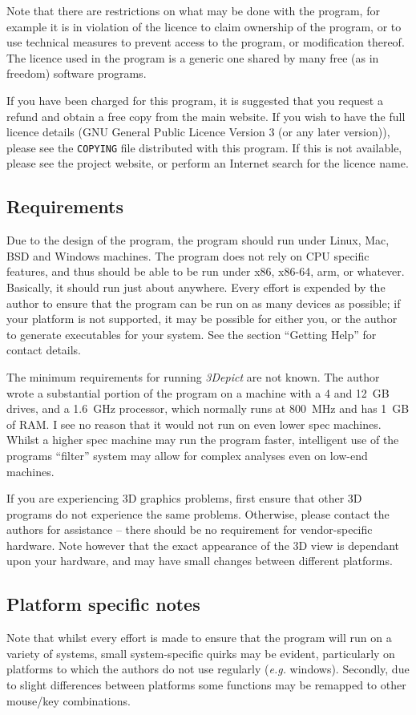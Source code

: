 \documentclass[10pt]{article}
\begin{document}
Note that there are restrictions on what may be done with the program, for example it is in violation of the licence to claim ownership of the program, or to use technical measures to prevent access to the program, or modification thereof. The licence used in the program is a generic one shared by many free (as in freedom) software programs. 

If you have been charged for this program, it is suggested that you request a refund and obtain a free copy from the main website. If you wish to have the full licence details (GNU General Public Licence Version 3 (or any later version)), please see the \texttt{COPYING} file distributed with this program. If this is not available, please see the project website, or perform an Internet search for the licence name.
 
\subsection{Requirements}
Due to the design of the program, the program should run under Linux, Mac, BSD and Windows machines. The program does not rely on CPU specific features, and thus should be able to be run under x86, x86-64, arm, or whatever. Basically, it should run just about anywhere. Every effort is expended by the author to ensure that the program can be run on as many devices as possible; if your platform is not supported, it may be possible for either you, or the author to generate executables for your system. See the section ``Getting Help'' for contact details.  

The minimum requirements for running \emph{3Depict} are not known. The author wrote a substantial portion of the program on a machine with a 4 and 12~GB drives, and a 1.6~GHz processor, which normally runs at 800~MHz and has 1~GB of RAM. I see no reason that it would not run on even lower spec machines. Whilst a higher spec machine may run the program faster, intelligent use of the programs ``filter'' system may allow for complex analyses even on low-end machines. 

If you are experiencing 3D graphics problems, first ensure that other 3D programs do not experience the same problems. Otherwise, please contact the authors for assistance -- there should be no requirement for vendor-specific hardware. Note however that the exact appearance of the 3D view is dependant upon your hardware, and may have small changes between different platforms. 

\subsection{Platform specific notes}
Note that whilst every effort is made to ensure that the program will run on a variety of systems, small system-specific quirks may be evident, particularly on platforms to which the authors do not use regularly (\emph{e.g.} windows). Secondly, due to slight differences between platforms some functions may be remapped to other mouse/key combinations.  
\end{document}
